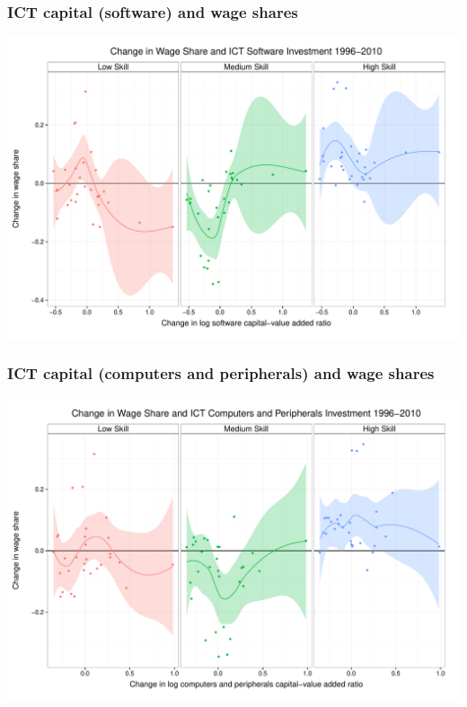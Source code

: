 \documentclass[red]{beamer}
\begin{document}
\begin{frame}[c]
  \frametitle{ICT capital (software) and wage shares}
\begin{center}
\includegraphics[width=\textwidth]{slides_fig/wage_share_software_skill.pdf}
\end{center}
\end{frame}

\begin{frame}[c]
  \frametitle{ICT capital (computers and peripherals) and wage shares}
\begin{center}
  \includegraphics[width=\textwidth]{slides_fig/wage_share_peripherals_skill.pdf}
\end{center}
\end{frame}
\end{document}
